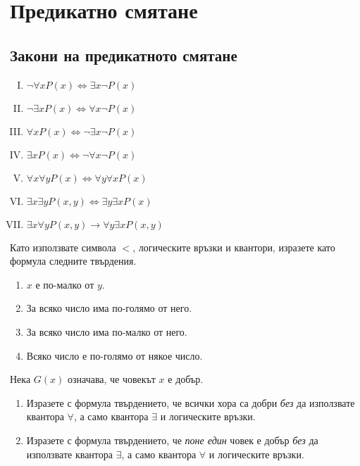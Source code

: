 \section*{Предикатно смятане}

\subsection*{Закони на предикатното смятане}

\begin{enumerate}[(I)]
  \item
    $\neg\forall x P(x) \iff \exists x \neg P(x)$
  \item
    $\neg\exists x P(x) \iff \forall x \neg P(x)$
  \item
    $\forall x P(x) \iff \neg\exists x \neg P(x)$
  \item
    $\exists x P(x) \iff \neg\forall x \neg P(x)$
  \item
    $\forall x \forall y P(x) \iff \forall y\forall x P(x)$
  \item
    $\exists x\exists y P(x,y) \iff \exists y \exists x P(x)$  
  \item
    $\exists x\forall y P(x,y) \rightarrow \forall y \exists x P(x,y)$
\end{enumerate}


\begin{problem}
  Като използвате символа $<$, логическите връзки и квантори, 
  изразете като формула следните твърдения.
  \begin{enumerate}[1)]
  \item
    $x$ е по-малко от $y$.
  \item
    За всяко число има по-голямо от него.
  \item
    За всяко число има по-малко от него.
  \item
    Всяко число е по-голямо от някое число.
  \end{enumerate}
\end{problem}

\begin{problem}
  Нека $G(x)$ означава, че човекът $x$ е добър.
  \begin{enumerate}[1)]
  \item
    Изразете с формула твърдението, че всички хора са добри {\em без}
    да използвате квантора $\forall$, а само квантора $\exists$ и логическите връзки.
  \item
    Изразете с формула твърдението, че {\em поне един} човек е добър {\em без}
    да използвате квантора $\exists$, а само квантора $\forall$ и логическите връзки.
  \end{enumerate}
\end{problem}

